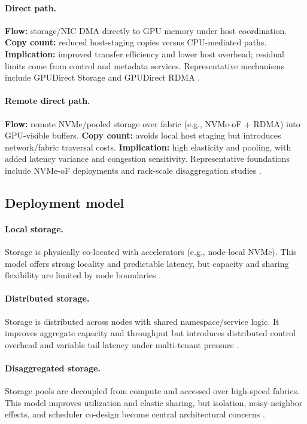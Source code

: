 \paragraph{Direct path.}
\textbf{Flow:} storage/NIC DMA directly to GPU memory under host coordination. \textbf{Copy count:} reduced host-staging copies versus CPU-mediated paths. \textbf{Implication:} improved transfer efficiency and lower host overhead; residual limits come from control and metadata services. Representative mechanisms include GPUDirect Storage and GPUDirect RDMA \cite{nvidia_gds_blog,nvidia_gds_overview,nvidia_gdrdma}.

\paragraph{Remote direct path.}
\textbf{Flow:} remote NVMe/pooled storage over fabric (e.g., NVMe-oF + RDMA) into GPU-visible buffers. \textbf{Copy count:} avoids local host staging but introduces network/fabric traversal costs. \textbf{Implication:} high elasticity and pooling, with added latency variance and congestion sensitivity. Representative foundations include NVMe-oF deployments and rack-scale disaggregation studies \cite{nvmeof_spec,infiniband_spec,liu2017rackscale}.

\subsection{Deployment model}

\paragraph{Local storage.}
Storage is physically co-located with accelerators (e.g., node-local NVMe). This model offers strong locality and predictable latency, but capacity and sharing flexibility are limited by node boundaries \cite{nvme_spec,nvidia_gds_overview}.

\paragraph{Distributed storage.}
Storage is distributed across nodes with shared namespace/service logic. It improves aggregate capacity and throughput but introduces distributed control overhead and variable tail latency under multi-tenant pressure \cite{zhang2025hpcstoragesurvey,murray2021tfdata}.

\paragraph{Disaggregated storage.}
Storage pools are decoupled from compute and accessed over high-speed fabrics. This model improves utilization and elastic sharing, but isolation, noisy-neighbor effects, and scheduler co-design become central architectural concerns \cite{liu2017rackscale,nvmeof_spec,infiniband_spec}.


